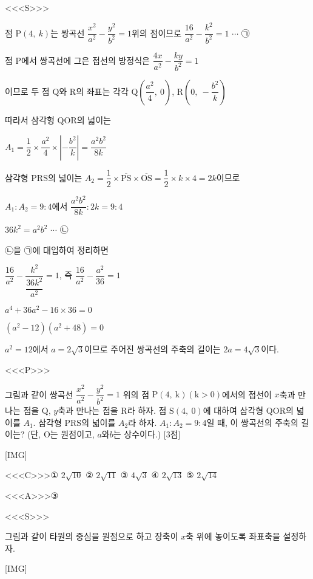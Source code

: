 \documentclass{oblivoir}
\begin{document}
<<<S>>>

점  $\mathrm{P}(4,\: k)$는 쌍곡선 $\dfrac{x^{2}}{a^{2}}-\dfrac{y^{2}}{b^{2}}=1$위의 점이므로 $\dfrac{16}{a^{2}}-\dfrac{k^{2}}{b^{2}}=1$ $\cdots$ ㉠

점 $\mathrm{P}$에서 쌍곡선에 그은 접선의 방정식은 $\dfrac{4x}{a^{2}}-\dfrac{ky}{b^{2}}=1$

이므로 두 점 $\mathrm{Q}$와 $\mathrm{R}$의 좌표는 각각 $\left .\mathrm{Q}\left(\dfrac{a^{2}}{4},\: 0\right)\right .$, $\mathrm{R}\left(0,\: -\dfrac{b^{2}}{k}\right)$

따라서 삼각형 $\mathrm{QOR}$의 넓이는 

$A_{1}=\dfrac{1}{2}\times\dfrac{a^{2}}{4}\times\left | -\dfrac{b^{2}}{k}\right | =\dfrac{a^{2}b^{2}}{8k}$

삼각형  $\mathrm{PRS}$의 넓이는 $A_{2}=\dfrac{1}{2}\times\overline{\mathrm{PS}}\times\overline{\mathrm{OS}}=\dfrac{1}{2}\times k\times 4=2k$이므로

$A_{1}:A_{2}=9:4$에서 $\dfrac{a^{2}b^{2}}{8k}:2k=9:4$

$36k^{2}=a^{2}b^{2}$ $\cdots$ ㉡

㉡을 ㉠에 대입하여 정리하면

$\dfrac{16}{a^{2}}-\dfrac{k^{2}}{\dfrac{36k^{2}}{a^{2}}}=1$, 즉 $\dfrac{16}{a^{2}}-\dfrac{a^{2}}{36}=1$

$a^{4}+36a^{2}-16\times 36=0$

$(a^{2}-12)(a^{2}+48)=0$

$a^{2}=12$에서 $a=2\sqrt{3}$이므로 주어진 쌍곡선의 주축의 길이는 $2a=4\sqrt{3}$이다.

<<<P>>>

그림과 같이 쌍곡선 $\dfrac{x^{2}}{a^{2}}-\dfrac{y^{2}}{b^{2}}=1$ 위의 점 $\mathrm{P}(4,\:\mathrm{k})(\mathrm{k}>0)$에서의 접선이 $x$축과 만나는 점을 $\mathrm{Q}$, $y$축과 만나는 점을 $\mathrm{R}$라 하자. 점 $\mathrm{S}(4,\: 0)$에 대하여 삼각형 $\mathrm{QOR}$의 넓이를 $A_{1}$. 삼각형 $\mathrm{PRS}$의 넓이를 $A_{2}$라 하자. $A_{1}:A_{2}=9:4$일 때, 이 쌍곡선의 주축의 길이는? (단, $\mathrm{O}$는 원점이고, $a$와$b$는 상수이다.) [3점]

[IMG]

<<<C>>>① $2\sqrt{10}$ ② $2\sqrt{11}$ ③ $4\sqrt{3}$ ④ $2\sqrt{13}$ ⑤ $2\sqrt{14}$

<<<A>>>③

<<<S>>>

그림과 같이 타원의 중심을 원점으로 하고 장축이 $x$축 위에 놓이도록 좌표축을 설정하자.

[IMG]
\end{document}

